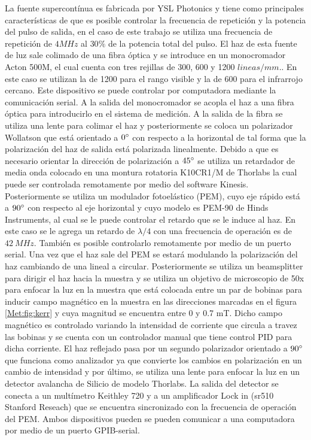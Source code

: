 \par La fuente supercont\'inua es fabricada  por YSL Photonics y tiene como principales caracter\'isticas de que es posible controlar la frecuencia de repetici\'on y la potencia del pulso de salida, en el caso de este trabajo se utiliza una frecuencia de repetici\'on de $4 MHz$ al $30\%$  de la potencia total del pulso. El haz de esta fuente de luz sale colimado de una fibra \'optica y se introduce en un monocromador Acton 500M, el cual cuenta con tres rejillas de 300, 600 y 1200 $lineas/mm.$. En este caso se utilizan la de 1200 para el rango visible y la de 600 para el infrarrojo cercano. Este dispositivo se puede controlar por computadora mediante la comunicaci\'on serial. A la salida del monocromador se acopla el haz a una fibra \'optica para introducirlo en el sistema de medici\'on. A la salida de la fibra se utiliza una lente para colimar el haz y  posteriormente se coloca un polarizador Wollatson que est\'a orientado a $0\degree$ con respecto a la horizontal de tal forma que la polarizaci\'on del haz de salida est\'a polarizada linealmente. Debido a que es necesario orientar la direcci\'on de polarizaci\'on a $45 \degree$ se utiliza un retardador de media onda colocado en una montura rotatoria K10CR1/M de Thorlabs la cual puede ser controlada remotamente por medio del software Kinesis. Posteriormente se utiliza un modulador fotoel\'astico (PEM), cuyo eje r\'apido est\'a a $90 \degree$ con respecto al eje horizontal y cuyo  modelo es PEM-90 de Hinds Instruments, al cual se le puede controlar el retardo que se le induce al haz. En este caso se le agrega un retardo de $\lambda/4$ con una frecuencia de operaci\'on es de $42~ MHz$. Tambi\'en es posible controlarlo remotamente por medio de un puerto serial. Una vez que el haz sale del PEM se estar\'a modulando la polarizaci\'on del haz cambiando de una lineal a circular. Posteriormente se utiliza un beamsplitter para dirigir el haz hacia la muestra y se utiliza un objetivo de microscopio de 50x para enfocar la luz en la muestra que est\'a colocada entre un par de bobinas para inducir campo magn\'etico en la muestra en las direcciones marcadas en el figura \ref{Met:fig:kerr} y cuya magnitud se encuentra entre 0 y 0.7 mT. Dicho campo magn\'etico es controlado  variando la intensidad de corriente que circula a travez las bobinas y se cuenta con un controlador manual que tiene control PID para dicha corriente. El haz reflejado pasa por un segundo polarizador orientado a $90 \degree$ que funciona como analizador ya que convierte los cambios en polarizaci\'on en un cambio de intensidad y por \'ultimo, se utiliza una lente para enfocar la luz en un detector avalancha de Silicio de modelo  Thorlabs. La salida del detector se conecta a un mult\'imetro Keithley 720  y a un amplificador Lock in (sr510 Stanford Reseach) que se encuentra sincronizado con la frecuencia de operaci\'on del PEM. Ambos dispositivos pueden se pueden comunicar a una computadora por medio de un puerto GPIB-serial.
